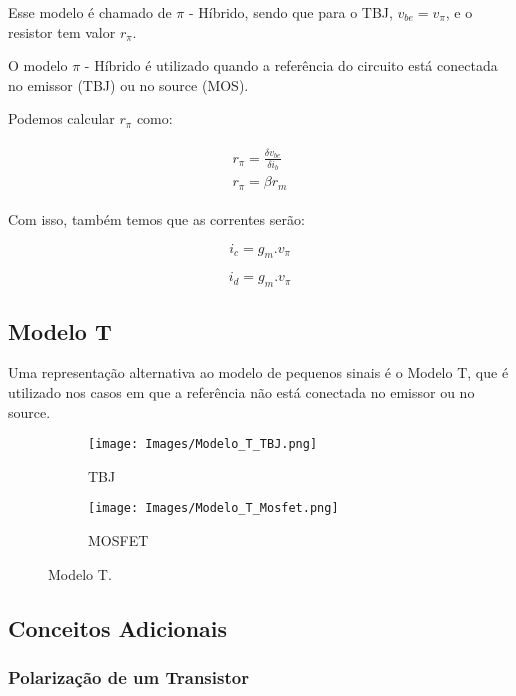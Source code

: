 \documentclass[12pt]{article}
\begin{document}
Esse modelo é chamado de $\pi$ - Híbrido, sendo que para o TBJ, $v_{be} = v_{\pi}$, e o resistor tem valor $r_{\pi}$.

O modelo $\pi$ - Híbrido é utilizado quando a referência do circuito está conectada no emissor (TBJ) ou no source (MOS).

Podemos calcular $r_{\pi}$ como:

\begin{align*}
  \begin{split}
    r_{\pi} = \frac{\delta v_{be}}{\delta i_b} \\[0.4cm]
    r_{\pi} = \beta r_m
  \end{split}
\end{align*}

Com isso, também temos que as correntes serão:

\begin{equation}
  i_c = g_m . v_{\pi}
  \tag{TBJ}
\end{equation}

\begin{equation}
  i_d = g_m . v_{\pi}
  \tag{MOSFET}
\end{equation} 

\subsection{Modelo T}

Uma representação alternativa ao modelo de pequenos sinais é o Modelo T, que é utilizado nos casos em que a referência não está conectada no emissor ou no source.

\begin{figure}[H]
  \centering
  \begin{subfigure}{.5\linewidth}
    \centering
    \texttt{[image: Images/Modelo\_T\_TBJ.png]}
    \caption{TBJ}
  \end{subfigure}%
  \begin{subfigure}{.5\linewidth}
    \centering
    \texttt{[image: Images/Modelo\_T\_Mosfet.png]}
    \caption{MOSFET}
  \end{subfigure}
  \caption{Modelo T.}
  \end{figure}

\subsection{Conceitos Adicionais}

\subsubsection{Polarização de um Transistor}
\end{document}
